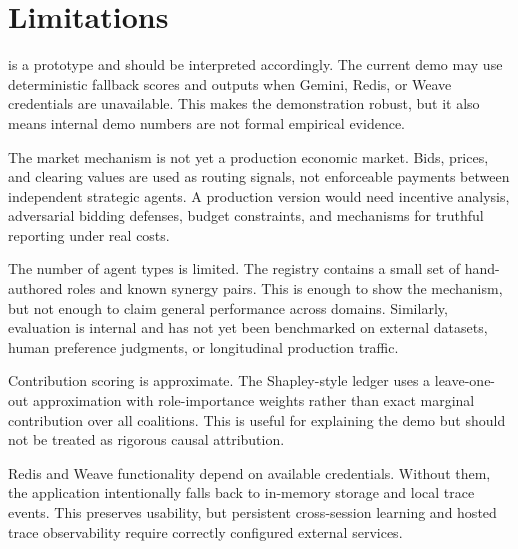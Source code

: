 \section{Limitations}

\systemname{} is a prototype and should be interpreted accordingly. The current demo may use deterministic fallback scores and outputs when Gemini, Redis, or Weave credentials are unavailable. This makes the demonstration robust, but it also means internal demo numbers are not formal empirical evidence.

The market mechanism is not yet a production economic market. Bids, prices, and clearing values are used as routing signals, not enforceable payments between independent strategic agents. A production version would need incentive analysis, adversarial bidding defenses, budget constraints, and mechanisms for truthful reporting under real costs.

The number of agent types is limited. The registry contains a small set of hand-authored roles and known synergy pairs. This is enough to show the mechanism, but not enough to claim general performance across domains. Similarly, evaluation is internal and has not yet been benchmarked on external datasets, human preference judgments, or longitudinal production traffic.

Contribution scoring is approximate. The Shapley-style ledger uses a leave-one-out approximation with role-importance weights rather than exact marginal contribution over all coalitions. This is useful for explaining the demo but should not be treated as rigorous causal attribution.

Redis and Weave functionality depend on available credentials. Without them, the application intentionally falls back to in-memory storage and local trace events. This preserves usability, but persistent cross-session learning and hosted trace observability require correctly configured external services.
